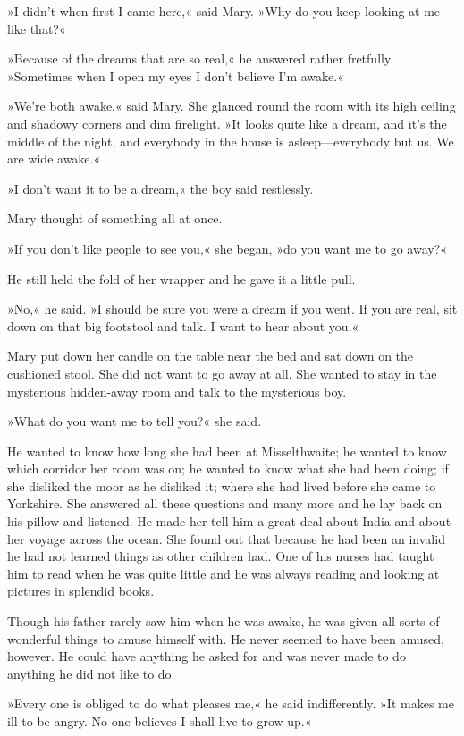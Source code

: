 »I didn't when first I came here,« said Mary. »Why do you keep looking at me like that?«

»Because of the dreams that are so real,« he answered rather fretfully. »Sometimes when I open my eyes I don't believe I'm awake.«

»We're both awake,« said Mary. She glanced round the room with its high ceiling and shadowy corners and dim firelight. »It looks quite like a dream, and it's the middle of the night, and everybody in the house is asleep—everybody but us. We are wide awake.«

»I don't want it to be a dream,« the boy said restlessly.

Mary thought of something all at once.

»If you don't like people to see you,« she began, »do you want me to go away?«

He still held the fold of her wrapper and he gave it a little pull.

»No,« he said. »I should be sure you were a dream if you went. If you are real, sit down on that big footstool and talk. I want to hear about you.«

Mary put down her candle on the table near the bed and sat down on the cushioned stool. She did not want to go away at all. She wanted to stay in the mysterious hidden-away room and talk to the mysterious boy.

»What do you want me to tell you?« she said.

He wanted to know how long she had been at Misselthwaite; he wanted to know which corridor her room was on; he wanted to know what she had been doing; if she disliked the moor as he disliked it; where she had lived before she came to Yorkshire. She answered all these questions and many more and he lay back on his pillow and listened. He made her tell him a great deal about India and about her voyage across the ocean. She found out that because he had been an invalid he had not learned things as other children had. One of his nurses had taught him to read when he was quite little and he was always reading and looking at pictures in splendid books.

Though his father rarely saw him when he was awake, he was given all sorts of wonderful things to amuse himself with. He never seemed to have been amused, however. He could have anything he asked for and was never made to do anything he did not like to do.

»Every one is obliged to do what pleases me,« he said indifferently. »It makes me ill to be angry. No one believes I shall live to grow up.«

